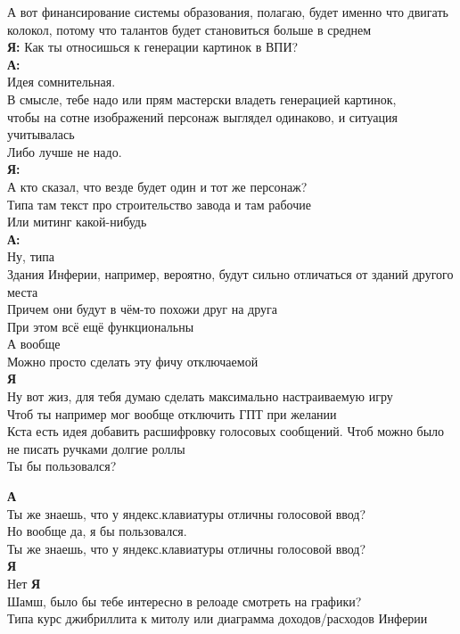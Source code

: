 \begin{tabbing}
А вот финансирование системы образования, полагаю, будет именно что двигать колокол, потому что талантов будет становиться больше в среднем\\

\textbf{Я:} Как ты относишься к генерации картинок в ВПИ?\\

\textbf{А:}\\
Идея сомнительная.\\
В смысле, тебе надо или прям мастерски владеть генерацией картинок,\\
чтобы на сотне изображений персонаж выглядел одинаково, и ситуация учитывалась\\
Либо лучше не надо.\\

\textbf{Я:}\\
А кто сказал, что везде будет один и тот же персонаж?\\
Типа там текст про строительство завода и там рабочие\\
Или митинг какой-нибудь\\

\textbf{А:}\\
Ну, типа\\
Здания Инферии, например, вероятно, будут сильно отличаться от зданий другого места\\
Причем они будут в чём-то похожи друг на друга\\
При этом всё ещё функциональны\\
А вообще\\
Можно просто сделать эту фичу отключаемой\\

\textbf{Я} \\
Ну вот жиз, для тебя думаю сделать максимально настраиваемую игру \\
Чтоб ты например мог вообще отключить ГПТ при желании \\
Кста есть идея добавить расшифровку голосовых сообщений. Чтоб можно было не писать ручками долгие роллы \\
Ты бы пользовался?

\textbf{А} \\
Ты же знаешь, что у яндекс.клавиатуры отличны голосовой ввод? \\
Но вообще да, я бы пользовался. \\
Ты же знаешь, что у яндекс.клавиатуры отличны голосовой ввод? \\
\textbf{Я} \\
Нет
\textbf{Я} \\
Шамш, было бы тебе интересно в релоаде смотреть на графики? \\
Типа курс джибриллита к митолу или диаграмма доходов/расходов Инферии


\end{tabbing}
